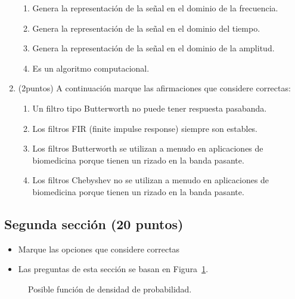 \documentclass[12pt,a4paper]{article}
\providecommand{\tightlist}{%
  \setlength{\itemsep}{0pt}\setlength{\parskip}{0pt}}\usepackage{longtable,booktabs,array}
\providecommand{\tightlist}{%
  \setlength{\itemsep}{0pt}\setlength{\parskip}{2pt}}
\begin{document}
\begin{enumerate}
  \begin{enumerate}
  \tightlist
  \item
    Genera la representación de la señal en el dominio de la frecuencia.
  \item
    Genera la representación de la señal en el dominio del tiempo.
  \item
    Genera la representación de la señal en el dominio de la amplitud.
  \item
    Es un algoritmo computacional.
  \end{enumerate}
\item
  (2puntos) A continuación marque las afirmaciones que considere
  correctas:

  \begin{enumerate}
  \tightlist
  \item
    Un filtro tipo Butterworth no puede tener respuesta pasabanda.
  \item
    Los filtros FIR (finite impulse response) siempre son estables.
  \item
    Los filtros Butterworth se utilizan a menudo en aplicaciones de
    biomedicina porque tienen un rizado en la banda pasante.
  \item
    Los filtros Chebyshev no se utilizan a menudo en aplicaciones de
    biomedicina porque tienen un rizado en la banda pasante.
  \end{enumerate}
\end{enumerate}

\subsection{Segunda sección (20
puntos)}\label{segunda-secciuxf3n-20-puntos}

\begin{itemize}
\tightlist
\item
  Marque las opciones que considere correctas
\item
  Las preguntas de esta sección se basan en Figura~\ref{fig-función}.
\end{itemize}

\begin{figure}


\caption{\label{fig-función}Posible función de densidad de
probabilidad.}

\end{figure}%
\end{document}
